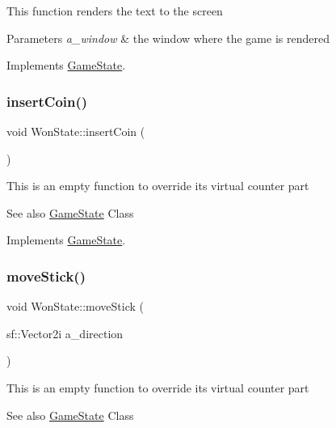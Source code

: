 This function renders the text to the screen


\begin{DoxyParams}{Parameters}
{\em a\+\_\+window} & the window where the game is rendered \\
\hline
\end{DoxyParams}


Implements \hyperlink{class_game_state_a5ffd5ce9acb7499ddef613e8836d1ef8}{Game\+State}.

\mbox{\label{class_won_state_aeaab03fa1a39188c19107047417c65b6}} 
\subsubsection{\texorpdfstring{insert\+Coin()}{insertCoin()}}
{\footnotesize\ttfamily void Won\+State\+::insert\+Coin (\begin{DoxyParamCaption}{ }\end{DoxyParamCaption})\hspace{0.3cm}{\ttfamily [virtual]}}

This is an empty function to override it\textquotesingle{}s virtual counter part \begin{DoxySeeAlso}{See also}
\hyperlink{class_game_state}{Game\+State} Class 
\end{DoxySeeAlso}


Implements \hyperlink{class_game_state_a4cd6f5b4ad23fc08dca287df26d94b94}{Game\+State}.

\mbox{\label{class_won_state_a56b272d25511e6a302136d308648464b}} 
\subsubsection{\texorpdfstring{move\+Stick()}{moveStick()}}
{\footnotesize\ttfamily void Won\+State\+::move\+Stick (\begin{DoxyParamCaption}\item[{sf\+::\+Vector2i}]{a\+\_\+direction }\end{DoxyParamCaption})\hspace{0.3cm}{\ttfamily [virtual]}}

This is an empty function to override it\textquotesingle{}s virtual counter part \begin{DoxySeeAlso}{See also}
\hyperlink{class_game_state}{Game\+State} Class 
\end{DoxySeeAlso}


